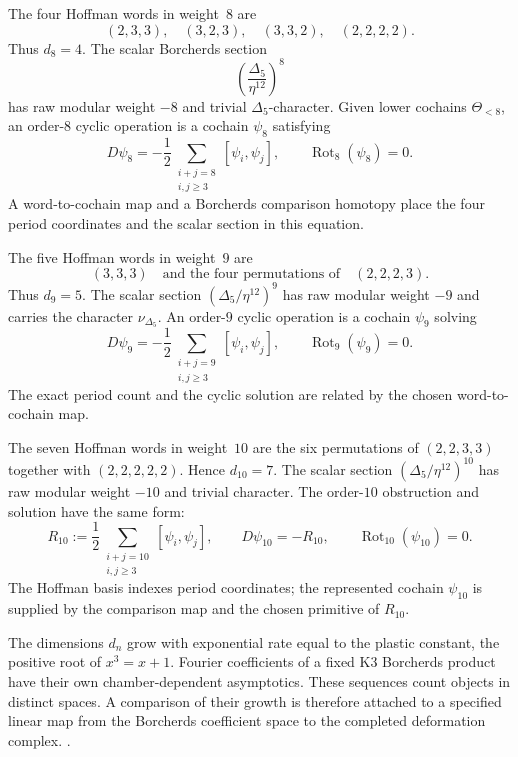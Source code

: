 \begin{remark}
\label{rem:nc-phi8}
The four Hoffman words in weight~$8$ are
\[
 (2,3,3),\quad(3,2,3),\quad(3,3,2),\quad(2,2,2,2).
\]
Thus \(d_8=4\).  The scalar Borcherds section
\[
 \left(\frac{\Delta_5}{\eta^{12}}\right)^8
\]
has raw modular weight \(-8\) and trivial
\(\Delta_5\)-character.  Given lower cochains
\(\Theta_{<8}\), an order-$8$ cyclic operation is a cochain
\(\psi_8\) satisfying
\[
 D\psi_8
 =
 -\frac12\!\sum_{\substack{i+j=8\\i,j\geq3}}
 [\psi_i,\psi_j],
 \qquad
 \operatorname{Rot}_8(\psi_8)=0.
\]
A word-to-cochain map and a Borcherds comparison homotopy place the
four period coordinates and the scalar section in this equation.
\end{remark}

\begin{remark}
\label{rem:nc-phi9}
The five Hoffman words in weight~$9$ are
\[
 (3,3,3)
 \quad\text{and the four permutations of}\quad
 (2,2,2,3).
\]
Thus \(d_9=5\).  The scalar section
\((\Delta_5/\eta^{12})^9\) has raw modular weight \(-9\) and carries
the character \(\nu_{\Delta_5}\).  An order-$9$ cyclic operation is
a cochain \(\psi_9\) solving
\[
 D\psi_9
 =
 -\frac12\!\sum_{\substack{i+j=9\\i,j\geq3}}
 [\psi_i,\psi_j],
 \qquad
 \operatorname{Rot}_9(\psi_9)=0.
\]
The exact period count and the cyclic solution are related by the
chosen word-to-cochain map.
\end{remark}

\begin{remark}
\label{rem:nc-phi10}
The seven Hoffman words in weight~$10$ are the six permutations of
\((2,2,3,3)\) together with \((2,2,2,2,2)\).  Hence \(d_{10}=7\).
The scalar section
\((\Delta_5/\eta^{12})^{10}\) has raw modular weight \(-10\) and
trivial character.  The order-$10$ obstruction and solution have the
same form:
\[
 R_{10}:=
 \frac12\!\sum_{\substack{i+j=10\\i,j\geq3}}
 [\psi_i,\psi_j],
 \qquad
 D\psi_{10}=-R_{10},
 \qquad
 \operatorname{Rot}_{10}(\psi_{10})=0.
\]
The Hoffman basis indexes period coordinates; the represented
cochain \(\psi_{10}\) is supplied by the comparison map and the
chosen primitive of \(R_{10}\).
\end{remark}

\begin{remark}
\label{rem:nc-asymptotic}
The dimensions \(d_n\) grow with exponential rate equal to the
plastic constant, the positive root of \(x^3=x+1\).  Fourier
coefficients of a fixed K3 Borcherds product have their own
chamber-dependent asymptotics.  These sequences count objects in
distinct spaces.  A comparison of their growth is therefore attached
to a specified linear map from the Borcherds coefficient space to the
completed deformation complex.
\cite{Brown2011,GritsenkoNikulin1998}.
\end{remark}

